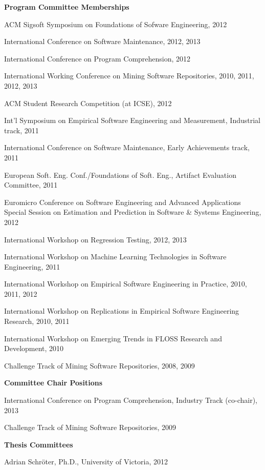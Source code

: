 \documentclass[margin,line,article,letterpaper]{res}
\newenvironment{list1}{
  \begin{list}{}{%
      \setlength{\itemsep}{0in}
      \setlength{\parsep}{0in} \setlength{\parskip}{0in}
      \setlength{\topsep}{0in} \setlength{\partopsep}{0in} 
      \setlength{\leftmargin}{0.17in}}}{\end{list}}
\begin{document}
\begin{resume}
\textbf{Program Committee Memberships}
\begin{list1}
\item ACM Sigsoft Symposium on Foundations of Sofware Engineering, 2012
\item International Conference on Software Maintenance, 2012, 2013
\item International Conference on Program Comprehension, 2012
\item International Working Conference on Mining Software Repositories, 2010, 2011, 2012, 2013
\item ACM Student Research Competition (at ICSE), 2012
\item Int'l Symposium on Empirical Software Engineering and Measurement, Industrial track, 2011
\item International Conference on Software Maintenance, Early Achievements track, 2011
\item European Soft. Eng. Conf./Foundations of Soft. Eng., Artifact Evaluation Committee, 2011
\item Euromicro Conference on Software Engineering and Advanced Applications Special Session on Estimation and Prediction in Software \& Systems Engineering, 2012
\item International Workshop on Regression Testing, 2012, 2013
\item International Workshop on Machine Learning Technologies in Software Engineering, 2011
\item International Workshop on Empirical Software Engineering in Practice, 2010, 2011, 2012
\item International Workshop on Replications in Empirical Software Engineering Research, 2010, 2011
\item International Workshop on Emerging Trends in FLOSS Research and Development, 2010
\item Challenge Track of Mining Software Repositories, 2008, 2009
\end{list1}

\textbf{Committee Chair Positions}
\begin{list1}
\item International Conference on Program Comprehension, Industry Track (co-chair), 2013
\item Challenge Track of Mining Software Repositories, 2009
\end{list1}

\textbf{Thesis Committees}
\begin{list1}
\item Adrian Schr\"{o}ter, Ph.D., University of Victoria, 2012
\end{list1}


\end{resume}
\end{document}
